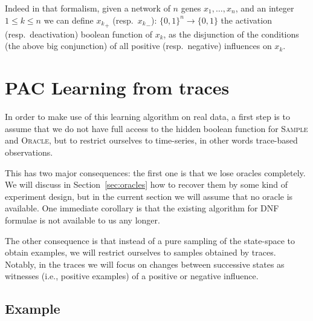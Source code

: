\documentclass{llncs}
\newcommand{\sylvain}[1]{\textcolor{green}{#1}}
\begin{document}
  Indeed in that formalism, given a network of $n$ genes $x_1,\ldots,x_n$, and
  an integer $1 \leq k \leq n$ we can define ${x_k}_+$ (resp.\ ${x_k}_-$):
  ${\{0,1\}}^n \rightarrow\{0,1\}$ the activation (resp.\ deactivation)
  boolean function of $x_k$, as the disjunction of the conditions (the above
  big conjunction) of all positive (resp.\ negative) influences on $x_k$.





\section{PAC Learning from traces}

In order to make use of this learning algorithm on real data, a first step is
to assume that we do not have full access to the hidden boolean function for
\textsc{Sample} and \textsc{Oracle}, but to restrict ourselves to time-series,
in other words trace-based observations.

This has two major consequences: the first one is that we lose oracles
completely. We will discuss in Section~\ref{sec:oracles} how to recover them
by some kind of experiment design, but in the current section we will assume
that no oracle is available. One immediate corollary is that the existing
algorithm for DNF formulae is not available to us any longer.

The other consequence is that instead of a pure sampling of the state-space to
obtain examples, we will restrict ourselves to samples obtained by traces.
Notably, in the traces we will focus on changes between successive states as
witnesses (i.e., positive examples) of a positive or negative influence.

\subsection{Example}
\end{document}
